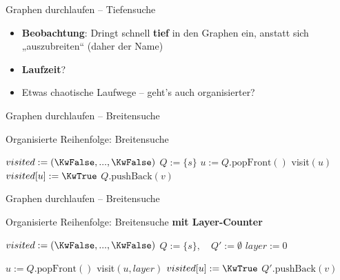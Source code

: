 \begin{frame}{Graphen durchlaufen – Tiefensuche}
	\begin{itemize}
		\item<+-> \textbf{Beobachtung}: Dringt schnell \textbf{tief} in den Graphen ein, anstatt sich „auszubreiten“ (daher der Name)
		\item<+-> \textbf{Laufzeit}? \visible<+->{$\Theta(n+m)$} \\ 
		\item<+-> Etwas chaotische Laufwege -- geht's auch organisierter?
	\end{itemize}
\end{frame}

\begin{frame}{Graphen durchlaufen – Breitensuche}
	\begin{exampleblock}{Organisierte Reihenfolge: Breitensuche}
		\begin{algorithm}[H]
			 {
				$visited := (\KwFalse, ... , \KwFalse)$\;
				$Q := \{s\}$ \;
				 {
					$u := Q.\text{popFront}()$\;
					 {
						visit$(u)$  \;
						$visited[u] := \KwTrue$\;
						 {
							$Q.\text{pushBack}(v)$\;
						}
					}
				}
			}
		\end{algorithm}
	\end{exampleblock}
\end{frame}

\begin{frame}{Graphen durchlaufen – Breitensuche}
	\begin{exampleblock}{Organisierte Reihenfolge: Breitensuche \textbf{mit Layer-Counter}}
		\begin{algorithm}[H]
			\small
			 {
				$visited := (\KwFalse, ... , \KwFalse)$\;
				$Q := \{s\}, \quad Q' := \emptyset$   \;
				$layer := 0$  \;
				 {
					$u := Q.\text{popFront}()$\;
					 {
						visit$(u, layer)$   \;
						$visited[u] := \KwTrue$ \;
						 {
							$Q'.\text{pushBack}(v)$   \;
						}
					}
					
				}
			}
		\end{algorithm}
	\end{exampleblock}
\end{frame}

